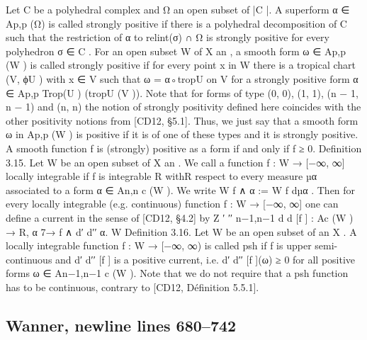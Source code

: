 \documentclass[
  10pt,
]{article}
\newenvironment{Shaded}{}{}
\newcommand{\NormalTok}[1]{#1}
\begin{document}
\begin{Shaded}
\begin{Highlighting}[]
\NormalTok{   Let C be a polyhedral complex and Ω an open subset of |C |. A superform α ∈ Ap,p (Ω)}
\NormalTok{is called strongly positive if there is a polyhedral decomposition of C such that the}
\NormalTok{restriction of α to relint(σ) ∩ Ω is strongly positive for every polyhedron σ ∈ C .}
\NormalTok{   For an open subset W of X an , a smooth form ω ∈ Ap,p (W ) is called strongly positive if}
\NormalTok{for every point x in W there is a tropical chart (V, ϕU ) with x ∈ V such that ω = α◦tropU}
\NormalTok{on V for a strongly positive form α ∈ Ap,p Trop(U ) (tropU (V )).}
\NormalTok{   Note that for forms of type (0, 0), (1, 1), (n − 1, n − 1) and (n, n) the notion of}
\NormalTok{strongly positivity defined here coincides with the other positivity notions from [CD12,}
\NormalTok{§5.1]. Thus, we just say that a smooth form ω in Ap,p (W ) is positive if it is of one of}
\NormalTok{these types and it is strongly positive.}
\NormalTok{   A smooth function f is (strongly) positive as a form if and only if f ≥ 0.}
\NormalTok{Definition 3.15. Let W be an open subset of X an . We call a function f : W → [−∞, ∞]}
\NormalTok{locally integrable if f is integrable}
\NormalTok{                             R          withR respect to every measure µα associated to a form}
\NormalTok{α ∈ An,n}
\NormalTok{       c  (W  ). We  write     W  f ∧ α := W f dµα .}
\NormalTok{   Then for every locally integrable (e.g. continuous) function f : W → [−∞, ∞] one can}
\NormalTok{define a current in the sense of [CD12, §4.2] by}
\NormalTok{                                                             Z}
\NormalTok{                        ′ ′′        n−1,n−1}
\NormalTok{                       d d [f ] : Ac        (W ) → R, α 7→      f ∧ d′ d′′ α.}
\NormalTok{                                                          W}
\NormalTok{Definition 3.16. Let W be an open subset of            an}
\NormalTok{                                                      X . A locally integrable  function}
\NormalTok{f : W → [−∞, ∞) is called psh if f is upper semi{-}continuous and d′ d′′ [f ] is a positive}
\NormalTok{current, i.e. d′ d′′ [f ](ω) ≥ 0 for all positive forms ω ∈ An−1,n−1}
\NormalTok{                                                             c       (W ).}
\NormalTok{  Note that we do not require that a psh function has to be continuous, contrary to}
\NormalTok{[CD12, Définition 5.5.1].}
\end{Highlighting}
\end{Shaded}

\subsection{Wanner, newline lines
680--742}\label{wanner-newline-lines-680742}
\end{document}
